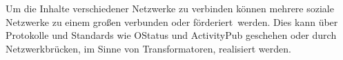 	Um die Inhalte verschiedener Netzwerke zu verbinden können mehrere soziale Netzwerke zu einem großen verbunden oder \glqq förderiert\grqq~werden. Dies kann über Protokolle und Standards wie OStatus und ActivityPub geschehen oder durch Netzwerkbrücken, im Sinne von Transformatoren, realisiert werden.\par
	\subsection{
	}
	\par
\section{
}
